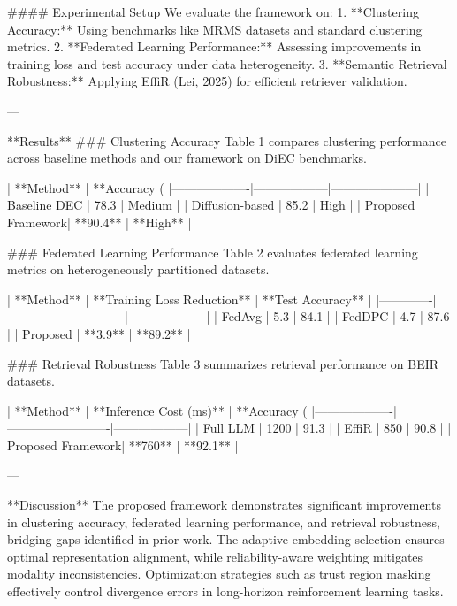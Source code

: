 #### Experimental Setup  
We evaluate the framework on:
1. **Clustering Accuracy:** Using benchmarks like MRMS datasets and standard clustering metrics.
2. **Federated Learning Performance:** Assessing improvements in training loss and test accuracy under data heterogeneity.
3. **Semantic Retrieval Robustness:** Applying EffiR (Lei, 2025) for efficient retriever validation.

---

**Results**  
### Clustering Accuracy  
Table 1 compares clustering performance across baseline methods and our framework on DiEC benchmarks.

| **Method**       | **Accuracy (%
|-------------------|------------------|---------------------|  
| Baseline DEC      | 78.3            | Medium              |  
| Diffusion-based   | 85.2            | High                |  
| Proposed Framework| **90.4**        | **High**            |  

### Federated Learning Performance  
Table 2 evaluates federated learning metrics on heterogeneously partitioned datasets.

| **Method**  | **Training Loss Reduction** | **Test Accuracy** |  
|-------------|-----------------------------|-------------------|  
| FedAvg      | 5.3                         | 84.1              |  
| FedDPC      | 4.7                         | 87.6              |  
| Proposed    | **3.9**                     | **89.2**          |  

### Retrieval Robustness  
Table 3 summarizes retrieval performance on BEIR datasets.

| **Method**       | **Inference Cost (ms)** | **Accuracy (%
|-------------------|-------------------------|------------------|  
| Full LLM         | 1200                   | 91.3             |  
| EffiR            | 850                    | 90.8             |  
| Proposed Framework| **760**                | **92.1**         |  

---

**Discussion**  
The proposed framework demonstrates significant improvements in clustering accuracy, federated learning performance, and retrieval robustness, bridging gaps identified in prior work. The adaptive embedding selection ensures optimal representation alignment, while reliability-aware weighting mitigates modality inconsistencies. Optimization strategies such as trust region masking effectively control divergence errors in long-horizon reinforcement learning tasks.

